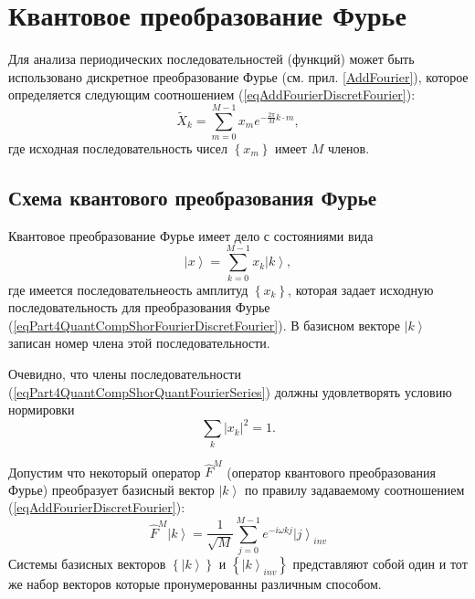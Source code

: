 \section{Квантовое преобразование Фурье}
Для анализа периодических последовательностей (функций) может быть
использовано дискретное преобразование Фурье
(см. прил. \ref{AddFourier}), которое определяется следующим соотношением
(\ref{eqAddFourierDiscretFourier}):
\begin{equation}
\tilde{X}_k = \sum^{M - 1}_{m = 0} x_m e^{-\frac{2 \pi}{M} k\cdot m},
\label{eqPart4QuantCompShorFourierDiscretFourier}
\end{equation}
где исходная последовательность чисел $\left\{x_m\right\}$ имеет $M$
членов. 

\subsection{Схема квантового преобразования Фурье}
Квантовое преобразование Фурье \cite{DBLP:conf/new2an/2015} имеет дело
с состояниями вида 
\begin{equation}
\left|x\right> = \sum_{k = 0}^{M - 1}x_k \left|k\right>,
\label{eqPart4QuantCompShorQuantFourierSeries}
\end{equation}
где имеется последовательнеость амплитуд $\left\{x_k\right\}$, которая
задает исходную последовательность для преобразования Фурье 
(\ref{eqPart4QuantCompShorFourierDiscretFourier}). В базисном векторе
$\left|k\right>$ записан номер члена этой последовательности.   

Очевидно, что члены последовательности
(\ref{eqPart4QuantCompShorQuantFourierSeries})  должны удовлетворять
условию нормировки 
\[
\sum_k\left|x_k\right|^2 = 1.
\]

Допустим что некоторый оператор $\hat{F}^{M}$ (оператор квантового
преобразования Фурье) преобразует базисный вектор $\left|k\right>$ по
правилу задаваемому соотношением (\ref{eqAddFourierDiscretFourier}):
\begin{equation}
\hat{F}^{M}\left|k\right> = \frac{1}{\sqrt{M}}\sum_{j = 0}^{M -1}
e^{-i \omega k j}\left|j\right>_{inv} 
\label{eqPart4QuantCompShorQuantFourierBasis}
\end{equation}
Системы базисных векторов $\left\{\left|k\right>\right\}$ и 
$\left\{\left|k\right>_{inv}\right\}$ представляют собой один и тот же
набор векторов которые пронумерованны различным способом.


